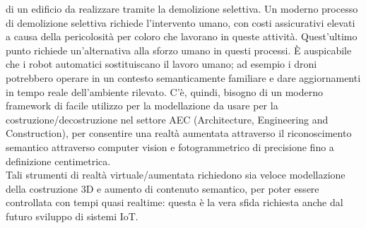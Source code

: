 di un edificio da realizzare tramite la demolizione selettiva. Un moderno processo di demolizione selettiva richiede l'intervento umano,
con costi assicurativi elevati a causa della pericolosità per coloro che lavorano in queste attività.
Quest'ultimo punto richiede un'alternativa alla sforzo umano in questi processi. \`E auspicabile che i robot automatici
sostituiscano il lavoro umano; ad esempio i droni potrebbero operare in un
contesto semanticamente familiare e dare aggiornamenti in tempo reale dell'ambiente rilevato.
C'è, quindi, bisogno di un moderno framework di facile utilizzo per la modellazione da usare per la
costruzione/decostruzione nel settore AEC (Architecture, Engineering and Construction),
per consentire una realtà aumentata attraverso il riconoscimento semantico attraverso computer vision e
fotogrammetrico di precisione fino a definizione centimetrica.\\
Tali strumenti di realtà virtuale/aumentata
richiedono sia veloce modellazione della costruzione 3D e aumento di contenuto semantico, per poter essere controllata con
tempi quasi realtime: questa è la vera sfida richiesta anche dal futuro sviluppo di sistemi IoT.
\newpage
